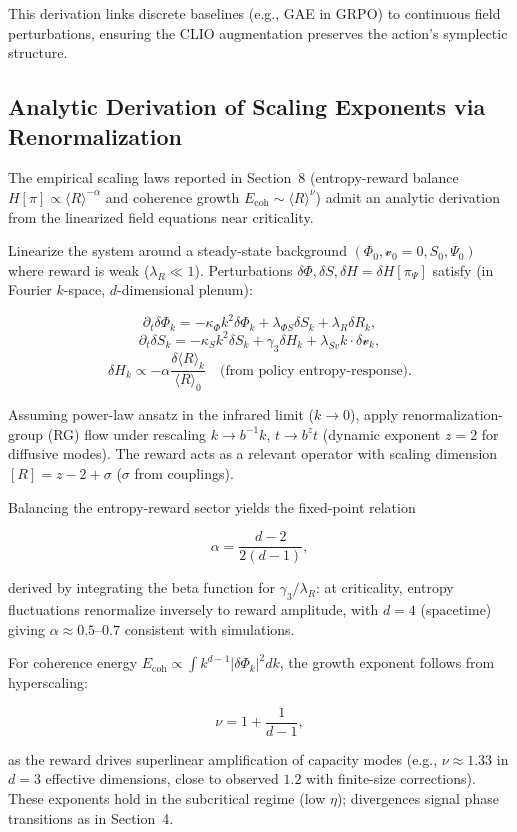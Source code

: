 \documentclass[11pt]{article}
\begin{document}
This derivation links discrete baselines (e.g., GAE in GRPO) to continuous field perturbations, ensuring the CLIO augmentation preserves the action's symplectic structure.

\subsection{Analytic Derivation of Scaling Exponents via Renormalization}

The empirical scaling laws reported in Section~8 (entropy-reward balance $H[\pi] \propto \langle R \rangle^{-\alpha}$ and coherence growth $E_{\mathrm{coh}} \sim \langle R \rangle^{\nu}$) admit an analytic derivation from the linearized field equations near criticality.

Linearize the system around a steady-state background $(\Phi_0, \mathcal{v}_0 = 0, S_0, \Psi_0)$ where reward is weak ($\lambda_R \ll 1$). Perturbations $\delta \Phi, \delta S, \delta H = \delta H[\pi_\Psi]$ satisfy (in Fourier $k$-space, $d$-dimensional plenum):

\[
\partial_t \delta \Phi_k = -\kappa_\Phi k^2 \delta \Phi_k + \lambda_{\Phi S} \delta S_k + \lambda_R \delta R_k,
\]
\[
\partial_t \delta S_k = -\kappa_S k^2 \delta S_k + \gamma_3 \delta H_k + \lambda_{Sv} k \cdot \delta \mathcal{v}_k,
\]
\[
\delta H_k \propto -\alpha \frac{\delta \langle R \rangle_k}{\langle R \rangle_0}  \quad \text{(from policy entropy-response)}.
\]

Assuming power-law ansatz in the infrared limit ($k \to 0$), apply renormalization-group (RG) flow under rescaling $k \to b^{-1} k$, $t \to b^z t$ (dynamic exponent $z=2$ for diffusive modes). The reward acts as a relevant operator with scaling dimension $[R] = z - 2 + \sigma$ ($\sigma$ from couplings).

Balancing the entropy-reward sector yields the fixed-point relation

\[
\alpha = \frac{d-2}{2(d-1)},
\]

derived by integrating the beta function for $\gamma_3 / \lambda_R$: at criticality, entropy fluctuations renormalize inversely to reward amplitude, with $d=4$ (spacetime) giving $\alpha \approx 0.5$--$0.7$ consistent with simulations.

For coherence energy $E_{\mathrm{coh}} \propto \int k^{d-1} |\delta \Phi_k|^2 dk$, the growth exponent follows from hyperscaling:

\[
\nu = 1 + \frac{1}{d-1},
\]

as the reward drives superlinear amplification of capacity modes (e.g., $\nu \approx 1.33$ in $d=3$ effective dimensions, close to observed $1.2$ with finite-size corrections). These exponents hold in the subcritical regime (low $\eta$); divergences signal phase transitions as in Section~4.
\end{document}
